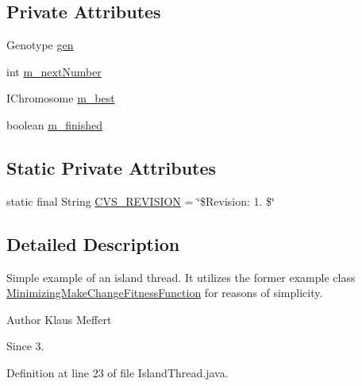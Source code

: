 \subsection*{Private Attributes}
\begin{DoxyCompactItemize}
\item 
Genotype \hyperlink{classexamples_1_1island_1_1_island_thread_a2e4604e91489adc609290bf791a2dbb5}{gen}
\item 
int \hyperlink{classexamples_1_1island_1_1_island_thread_a8ac5b56bd618165a1514440e39fe320a}{m\-\_\-next\-Number}
\item 
I\-Chromosome \hyperlink{classexamples_1_1island_1_1_island_thread_a6bc44da1d0ca531ed0d04d6ccd7b2d6f}{m\-\_\-best}
\item 
boolean \hyperlink{classexamples_1_1island_1_1_island_thread_a5c59594d897f6d104fc638f4ee15d4c9}{m\-\_\-finished}
\end{DoxyCompactItemize}
\subsection*{Static Private Attributes}
\begin{DoxyCompactItemize}
\item 
static final String \hyperlink{classexamples_1_1island_1_1_island_thread_a1e891992a69128d40a808b80019b1c3e}{C\-V\-S\-\_\-\-R\-E\-V\-I\-S\-I\-O\-N} = \char`\"{}\$Revision\-: 1. \$\char`\"{}
\end{DoxyCompactItemize}


\subsection{Detailed Description}
Simple example of an island thread. It utilizes the former example class \hyperlink{classexamples_1_1_minimizing_make_change_fitness_function}{Minimizing\-Make\-Change\-Fitness\-Function} for reasons of simplicity.

\begin{DoxyAuthor}{Author}
Klaus Meffert 
\end{DoxyAuthor}
\begin{DoxySince}{Since}
3. 
\end{DoxySince}


Definition at line 23 of file Island\-Thread.\-java.



